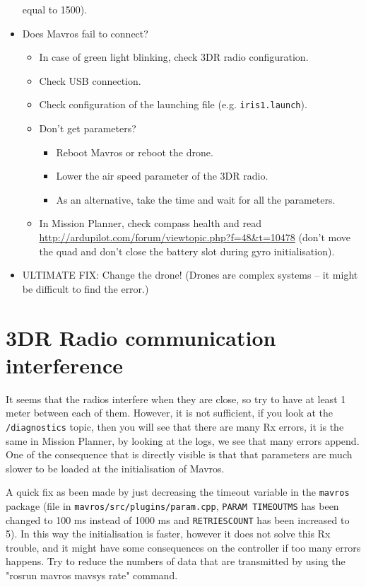 \documentclass[titlepage,11pt,a4paper]{article}
\begin{document}
\begin{appendices}
\begin{itemize}
    equal to 1500).
  \item Does Mavros fail to connect?
    \begin{itemize}
      \item In case of green light blinking, check 3DR radio
        configuration.
      \item Check USB connection.
      \item Check configuration of the launching file (e.g. \texttt{iris1.launch}).
      \item Don't get parameters?
        \begin{itemize}
          \item Reboot Mavros or reboot the drone.
          \item Lower the air speed parameter of the 3DR radio.
          \item As an alternative, take the time and wait for all the
            parameters.
        \end{itemize}
      \item In Mission Planner, check compass health and read
        \url{http://ardupilot.com/forum/viewtopic.php?f=48&t=10478}
        (don't move the quad and don't close the battery slot during gyro
        initialisation).
    \end{itemize}
  \item ULTIMATE FIX: Change the drone! (Drones are complex systems -- it
    might be difficult to find the error.)
\end{itemize}
    
\section{3DR Radio communication interference}
It seems that the radios interfere when they are close, so try to have
at least 1 meter between each of them.  However, it is not sufficient,
if you look at the \texttt{/diagnostics} topic, then you will see that there
are many Rx errors, it is the same in Mission Planner, by looking at
the logs, we see that many errors append. One of the consequence that
is directly visible is that that parameters are much slower to be
loaded at the initialisation of Mavros.

A quick fix as been made by just decreasing the timeout variable in
the \texttt{mavros} package (file in
\texttt{mavros/src/plugins/param.cpp}, \texttt{PARAM\textunderscore
  TIMEOUT\textunderscore MS} has been changed to 100 ms instead of
1000 ms and \texttt{RETRIES\textunderscore COUNT} has been increased
to 5). In this way the initialisation is faster, however it does not
solve this Rx trouble, and it might have some consequences on the
controller if too many errors happens.  Try to reduce the numbers of
data that are transmitted by using the "rosrun mavros mavsys rate"
command.


\end{appendices}
\end{document}
